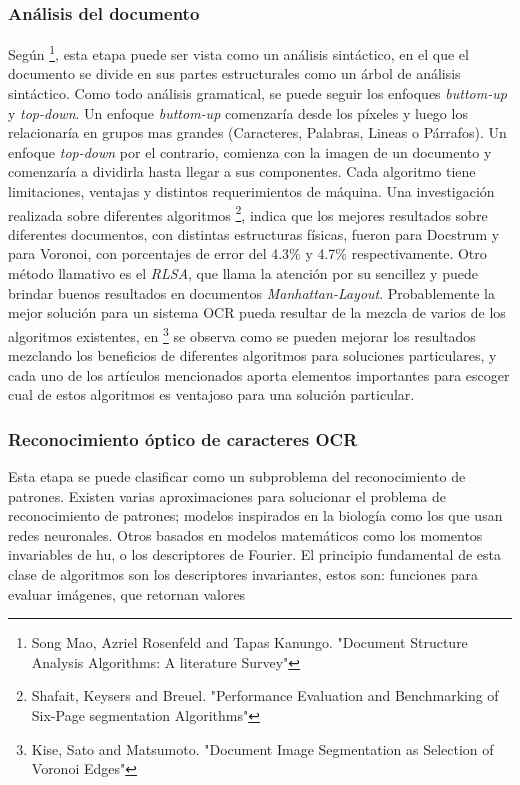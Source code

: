 \documentclass[a4paper, 11pt, oneside]{article}
\begin{document}
	\subsubsection{Análisis del documento}
	Según \footnote{Song Mao, Azriel Rosenfeld and Tapas Kanungo. "Document Structure Analysis
	Algorithms: A literature Survey"}, esta etapa puede ser vista como un análisis sintáctico,
	en el que el documento se divide en sus partes estructurales como un árbol de análisis
	sintáctico. Como todo análisis gramatical, se puede seguir los enfoques
	\textit{buttom-up} y \textit{top-down}. Un enfoque \textit{buttom-up} comenzaría desde
	los píxeles y luego los relacionaría en grupos mas grandes (Caracteres, Palabras, Lineas
	o Párrafos). Un enfoque \textit{top-down} por el contrario, comienza con la imagen de un
	documento y comenzaría a dividirla hasta llegar a sus componentes.
	Cada algoritmo tiene limitaciones, ventajas y distintos requerimientos de máquina.
	Una investigación realizada sobre diferentes algoritmos \footnote{Shafait, Keysers and Breuel.
	"Performance Evaluation and Benchmarking of Six-Page segmentation Algorithms"}, indica que los
	mejores resultados sobre diferentes documentos, con distintas estructuras físicas,
	fueron para Docstrum y para Voronoi, con porcentajes de error del 4.3\% y 4.7\% respectivamente.
	Otro método	llamativo es el \textit{RLSA}, que llama la atención por su sencillez y puede brindar
	buenos resultados en documentos \textit{Manhattan-Layout}.
	Probablemente la mejor solución para un sistema OCR pueda resultar de la mezcla de
	varios de los algoritmos existentes, en \footnote{Kise, Sato and Matsumoto. "Document Image 
	Segmentation as Selection of Voronoi Edges"} se observa como se pueden mejorar
	los resultados mezclando los beneficios de diferentes algoritmos para soluciones
	particulares, y cada uno de los artículos mencionados aporta elementos importantes para
    escoger cual de estos algoritmos es ventajoso para una solución particular.
	
	\subsubsection{Reconocimiento óptico de caracteres OCR}
	Esta etapa se puede clasificar como un subproblema del reconocimiento de patrones.
	Existen varias aproximaciones para solucionar el problema de reconocimiento de patrones; 
	modelos inspirados en la biología como los que usan redes neuronales. Otros
	basados en modelos matemáticos como los momentos invariables de hu, o los
	descriptores de Fourier. El principio fundamental de esta clase de algoritmos son
	los descriptores invariantes, estos son: funciones para evaluar imágenes, que retornan valores 
\end{document}
